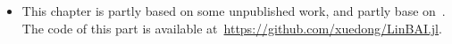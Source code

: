 %
%
%


\medskip

\begin{itemize}[label=]
    \item This chapter is partly based on some unpublished work, and partly base on~\cite{degenne2020game}. The code of this part is available at~\url{https://github.com/xuedong/LinBAI.jl}.
\end{itemize}

